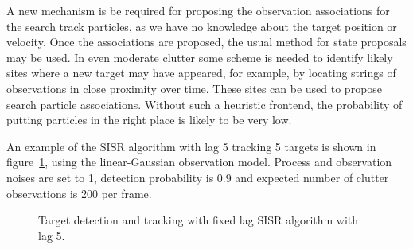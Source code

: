 A new mechanism is be required for proposing the observation associations for the search track particles, as we have no knowledge about the target position or velocity. Once the associations are proposed, the usual method for state proposals may be used. In even moderate clutter some scheme is needed to identify likely sites where a new target may have appeared, for example, by locating strings of observations in close proximity over time. These sites can be used to propose search particle associations. Without such a heuristic frontend, the probability of putting particles in the right place is likely to be very low.

An example of the SISR algorithm with lag 5 tracking 5 targets is shown in figure~\ref{fig:DetectionTracking}, using the linear-Gaussian observation model. Process and observation noises are set to 1, detection probability is 0.9 and expected number of clutter observations is 200 per frame.

\begin{figure} \centering
{}
\caption{Target detection and tracking with fixed lag SISR algorithm with lag 5.}%
\label{fig:DetectionTracking}%
\end{figure}